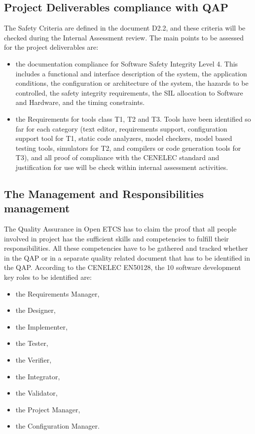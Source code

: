 \documentclass{template/openetcs_report}
\begin{document}
\subsection{Project Deliverables compliance with QAP}
The Safety Criteria are defined in the document D2.2, and these criteria will be checked during the Internal Assessment review. The main points to be assessed for the project deliverables are:
\begin{itemize}
\item the documentation compliance for Software Safety Integrity Level 4. This includes a functional and interface description of the system, the application conditions, the configuration or architecture of the system, the hazards to be controlled, the safety integrity requirements, the SIL allocation to Software and Hardware, and the timing constraints.
\item the Requirements for tools class T1, T2 and T3. Tools have been identified so far for each category (text editor, requirements support, configuration support tool for T1,  static code analyzers, model checkers, model based testing tools, simulators for T2, and compilers or code generation tools for T3), and all proof of compliance with the CENELEC standard and justification for use will be check within internal assessment activities.
\end{itemize}

\subsection{The Management and Responsibilities management}
The Quality Assurance in Open ETCS has to claim the proof that all people involved in project has the sufficient skills and competencies to fulfill their responsibilities. All these competencies have to be gathered and tracked whether in the QAP or in a separate quality related document that has to be identified in the QAP.
According to the CENELEC EN50128, the 10 software development key roles to be identified are:
\begin{itemize}
\item the Requirements Manager,
\item the Designer,
\item the Implementer,
\item the Tester,
\item the Verifier,
\item the Integrator,
\item the Validator,
\item the Project Manager,
\item the Configuration Manager.
\end{itemize}
\end{document}

